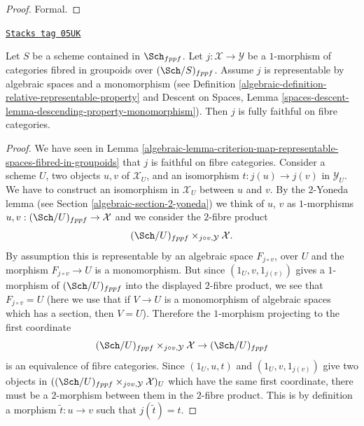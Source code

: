 \begin{proof}
Formal.
\end{proof}

\begin{lemma}
\label{algebraic-lemma-open-fibred-category-is-full}
\href{https://stacks.math.columbia.edu/tag/05UK}{\texttt{Stacks tag 05UK}}

Let $S$ be a scheme contained in $\Sch_{fppf}$.
Let $j : \mathcal X \to \mathcal Y$ be a $1$-morphism of
categories fibred in groupoids over $(\Sch/S)_{fppf}$.
Assume $j$ is representable by algebraic spaces and a monomorphism
(see
Definition \ref{algebraic-definition-relative-representable-property}
and
Descent on Spaces, Lemma
\ref{spaces-descent-lemma-descending-property-monomorphism}).
Then $j$ is fully faithful on fibre categories.
\end{lemma}

\begin{proof}

We have seen in
Lemma \ref{algebraic-lemma-criterion-map-representable-spaces-fibred-in-groupoids}
that $j$ is faithful on fibre categories. Consider a scheme $U$,
two objects $u, v$ of $\mathcal{X}_U$, and an isomorphism
$t : j(u) \to j(v)$ in $\mathcal{Y}_U$. We have to construct an
isomorphism in $\mathcal{X}_U$ between $u$ and $v$.
By the $2$-Yoneda lemma (see Section \ref{algebraic-section-2-yoneda})
we think of $u$, $v$ as $1$-morphisms
$u, v : (\Sch/U)_{fppf} \to \mathcal{X}$
and we consider the $2$-fibre product
$$
(\Sch/U)_{fppf} \times_{j \circ v, \mathcal{Y}} \mathcal{X}.
$$
By assumption this is representable by an algebraic space
$F_{j \circ v}$, over $U$ and the morphism
$F_{j \circ v} \to U$ is a monomorphism.
But since $(1_U, v, 1_{j(v)})$ gives a $1$-morphism of
$(\Sch/U)_{fppf}$ into the displayed $2$-fibre product,
we see that $F_{j \circ v} = U$ (here we use
that if $V \to U$ is a monomorphism of algebraic spaces which has a
section, then $V = U$). Therefore the $1$-morphism projecting to
the first coordinate
$$
(\Sch/U)_{fppf} \times_{j \circ v, \mathcal{Y}} \mathcal{X}
\to (\Sch/U)_{fppf}
$$
is an equivalence of fibre categories.
Since $(1_U, u, t)$ and $(1_U, v, 1_{j(v)})$ give two
objects in $((\Sch/U)_{fppf} \times_{j \circ v, \mathcal{Y}}
\mathcal{X})_U$ which have the same first coordinate, there must
be a $2$-morphism between them in the $2$-fibre product.
This is by definition a morphism $\tilde t : u \to v$ such that
$j(\tilde t) = t$.
\end{proof}

